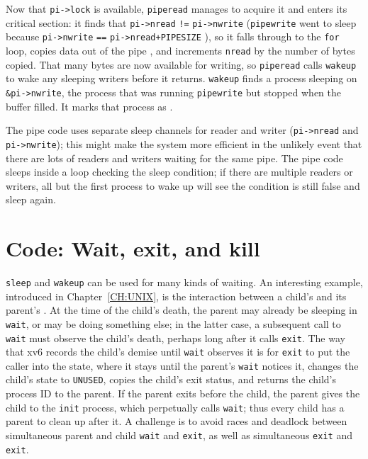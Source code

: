 Now that
\lstinline{pi->lock}
is available,
\lstinline{piperead}
manages to acquire it and enters its critical section:
it finds that
\lstinline{pi->nread}
\lstinline{!=}
\lstinline{pi->nwrite}
(\lstinline{pipewrite}
went to sleep because
\lstinline{pi->nwrite}
\lstinline{==}
\lstinline{pi->nread+PIPESIZE}
),
so it falls through to the 
\lstinline{for}
loop, copies data out of the pipe
,
and increments 
\lstinline{nread}
by the number of bytes copied.
That many bytes are now available for writing, so
\lstinline{piperead}
calls
\lstinline{wakeup}
to wake any sleeping writers
before it returns.
\lstinline{wakeup}
finds a process sleeping on
\lstinline{&pi->nwrite},
the process that was running
\lstinline{pipewrite}
but stopped when the buffer filled.
It marks that process as
.

The pipe code uses separate sleep channels for reader and writer
(\lstinline{pi->nread}
and
\lstinline{pi->nwrite});
this might make the system more efficient in the unlikely
event that there are lots of
readers and writers waiting for the same pipe.
The pipe code sleeps inside a loop checking the
sleep condition; if there are multiple readers
or writers, all but the first process to wake up
will see the condition is still false and sleep again.
\section{Code: Wait, exit, and kill}
\lstinline{sleep}
and
\lstinline{wakeup}
can be used for many kinds of waiting.
An interesting example, introduced in Chapter~\ref{CH:UNIX},
is the interaction between a child's 
and its parent's .
At the time of the child's death, the parent may already
be sleeping in {\tt wait}, or may be doing something else;
in the latter case, a subsequent call to {\tt wait} must
observe the child's death, perhaps long after it calls {\tt exit}.
The way that xv6 records the child's demise until {\tt wait}
observes it is for {\tt exit} to put the caller into the 
state, where it stays until the parent's {\tt wait} notices it, changes
the child's state to {\tt UNUSED}, copies the child's exit status,
and returns the child's process ID to the parent.
If the parent exits before the child, the 
parent gives the child to the
\lstinline{init}
process, which perpetually calls {\tt wait};
thus
every child has a parent to clean up after it.
A challenge is
to avoid races and deadlock between
simultaneous parent and child
\lstinline{wait}
and
\lstinline{exit},
as well as simultaneous
\lstinline{exit} and \lstinline{exit}.

